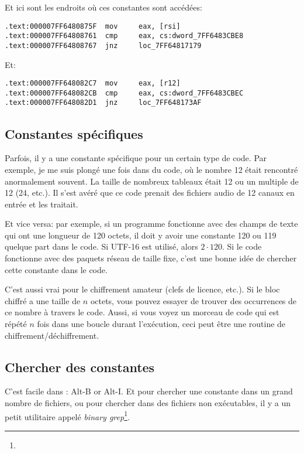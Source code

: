 Et ici sont les endroits où ces constantes sont accédées:

\begin{lstlisting}[caption=dhcpcore.dll (Windows 7 x64),style=customasmx86]
.text:000007FF6480875F  mov     eax, [rsi]
.text:000007FF64808761  cmp     eax, cs:dword_7FF6483CBE8
.text:000007FF64808767  jnz     loc_7FF64817179
\end{lstlisting}

Et:

\begin{lstlisting}[caption=dhcpcore.dll (Windows 7 x64),style=customasmx86]
.text:000007FF648082C7  mov     eax, [r12]
.text:000007FF648082CB  cmp     eax, cs:dword_7FF6483CBEC
.text:000007FF648082D1  jnz     loc_7FF648173AF
\end{lstlisting}

\subsection{Constantes spécifiques}

Parfois, il y a une constante spécifique pour un certain type de code.
Par exemple, je me suis plongé une fois dans du code, où le nombre 12 était rencontré
anormalement souvent.
La taille de nombreux tableaux était 12 ou un multiple de 12 (24, etc.).
Il s'est avéré que ce code prenait des fichiers audio de 12 canaux en entrée et les
traitait.

Et vice versa: par exemple, si un programme fonctionne avec des champs de texte qui
ont une longueur de 120 octets, il doit y avoir une constante 120 ou 119 quelque
part dans le code.
Si UTF-16 est utilisé, alors $2 \cdot 120$.
Si le code fonctionne avec des paquets réseau de taille fixe, c'est une bonne idée
de chercher cette constante dans le code.

C'est aussi vrai pour le chiffrement amateur (clefs de licence, etc.).
Si le bloc chiffré a une taille de $n$ octets, vous pouvez essayer de trouver des
occurrences de ce nombre à travers le code.
Aussi, si vous voyez un morceau de code qui est répété $n$ fois dans une boucle durant
l'exécution, ceci peut être une routine de chiffrement/déchiffrement.

\subsection{Chercher des constantes}

C'est facile dans \IDA: Alt-B or Alt-I.
Et pour chercher une constante dans un grand nombre de fichiers, ou pour chercher
dans des fichiers non exécutables, il y a un petit utilitaire appelé \emph{binary grep}\footnote{\BGREPURL}.

